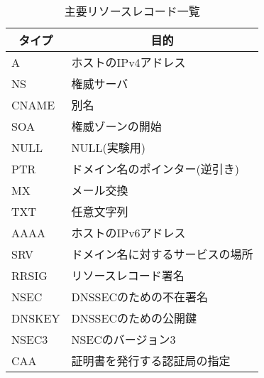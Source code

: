 \begin{table}[h]
 \caption{主要リソースレコード一覧}
 \centering
  \begin{tabular}{ll}
    \toprule
		\multicolumn{1}{c}{\textbf{タイプ}} & \multicolumn{1}{c}{\textbf{目的}} \\
    \midrule
    A &  ホストのIPv4アドレス \\
    NS & 権威サーバ \\
    CNAME & 別名 \\
    SOA & 権威ゾーンの開始 \\
    NULL & NULL(実験用) \\
    PTR & ドメイン名のポインター(逆引き) \\
    MX & メール交換 \\
    TXT & 任意文字列 \\
    AAAA & ホストのIPv6アドレス \\
		SRV & ドメイン名に対するサービスの場所\\
    RRSIG & リソースレコード署名\\
    NSEC & DNSSECのための不在署名\\
    DNSKEY & DNSSECのための公開鍵\\
    NSEC3 & NSECのバージョン3\\
    CAA & 証明書を発行する認証局の指定\\
    \bottomrule
  \end{tabular}
 \label{tab:resource-record}
\end{table}
